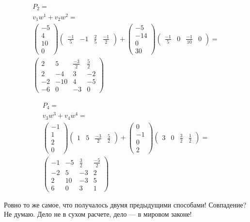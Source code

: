 \documentclass[12pt, a4paper]{article}
\begin{document}
    \begin{multline}
        P_{2} = \\
        v_1 w^1 + v_2 w^2 = \\
        \begin{pmatrix} -5\\4\\10\\0 \end{pmatrix}
        \begin{pmatrix}
            \frac{-1}{5} & -1 & \frac{2}{5} & \frac{-1}{2}
        \end{pmatrix} + \begin{pmatrix} -5\\-14\\0\\30 \end{pmatrix}
        \begin{pmatrix}
            \frac{-1}{5} & 0 & \frac{-1}{10} & 0
        \end{pmatrix} = \\
         \left(\begin{matrix}
            2 & 5 & \frac{-3}{2} & \frac{5}{2} \\
            2 & -4 & 3 & -2 \\
            -2 & -10 & 4 & -5 \\
            -6 & 0 & -3 & 0
        \end{matrix}\right)
    \end{multline}


    \begin{multline}
        P_{4} = \\
        v_3 w^3 + v_4 w^4 = \\
         \begin{pmatrix} -1\\1\\2\\0 \end{pmatrix} \begin{pmatrix}
            1 & 5 & \frac{-3}{2} & \frac{5}{2}
        \end{pmatrix} + \begin{pmatrix} 0\\-1\\0\\2 \end{pmatrix} \begin{pmatrix}
            3 & 0 & \frac{3}{2} & \frac{1}{2}
        \end{pmatrix} = \\
        \left(\begin{matrix}
            -1 & -5 & \frac{3}{2} & \frac{-5}{2} \\
            -2 & 5 & -3 & 2 \\
            2 & 10 & -3 & 5 \\
            6 & 0 & 3 & 1
        \end{matrix}\right)
    \end{multline}

    

    Ровно то же самое, что получалось двумя предыдущими способами! Совпадение? Не думаю. Дело не в сухом расчете, дело — в мировом законе!
\end{document}
